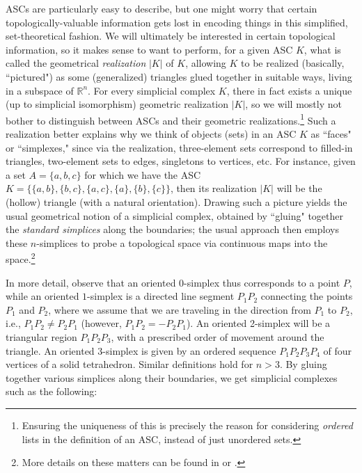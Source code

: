 \documentclass[11pt]{book}
\theoremstyle{definition}
\theoremstyle{definition}
\theoremstyle{definition}
\theoremstyle{theorem}
\theoremstyle{definition}
\begin{document}
ASCs are particularly easy to describe, but one might worry that certain topologically-valuable information gets lost in encoding things in this simplified, set-theoretical fashion. We will ultimately be interested in certain topological information, so it makes sense to want to perform, for a given ASC $K$, what is called the geometrical \textit{realization} $|K|$ of $K$, allowing $K$ to be realized (basically, ``pictured") as some (generalized) triangles glued together in suitable ways, living in a subspace of $\mathbb{R}^n$. For every simplicial complex $K$, there in fact exists a unique (up to simplicial isomorphism) geometric realization $|K|$, so we will mostly not bother to distinguish between ASCs and their geometric realizations.\footnote{Ensuring the uniqueness of this is precisely the reason for considering \textit{ordered} lists in the definition of an ASC, instead of just unordered sets.} Such a realization better explains why we think of objects (sets) in an ASC $K$ as ``faces" or ``simplexes," since via the realization, three-element sets correspond to filled-in triangles, two-element sets to edges, singletons to vertices, etc. For instance, given a set $A = \{a,b,c\}$ for which we have the ASC $K = \{\{a,b\}, \{b,c\}, \{a,c\}, \{a\}, \{b\}, \{c\}\}$, then its realization $|K|$ will be the (hollow) triangle (with a natural orientation). Drawing such a picture yields the usual geometrical notion of a simplicial complex, obtained by ``gluing" together the \textit{standard simplices} along the boundaries; the usual approach then employs these $n$-simplices to probe a topological space via continuous maps into the space.\footnote{More details on these matters can be found in \cite{ghrist_elementary_2014} or \cite{hatcher_algebraic_2001}.} \par 
In more detail, observe that an oriented $0$-simplex thus corresponds to a point $P$, while an oriented $1$-simplex is a directed line segment $P_1P_2$ connecting the points $P_1$ and $P_2$, where we assume that we are traveling in the direction from $P_1$ to $P_2$, i.e., $P_1P_2 \neq P_2P_1$ (however, $P_1P_2 = -P_2P_1$). An oriented 2-simplex will be a triangular region $P_1P_2P_3$, with a prescribed order of movement around the triangle. An oriented $3$-simplex is given by an ordered sequence $P_1P_2P_3P_4$ of four vertices of a solid tetrahedron. Similar definitions hold for $n > 3$. By gluing together various simplices along their boundaries, we get simplicial complexes such as the following: 
\end{document}
